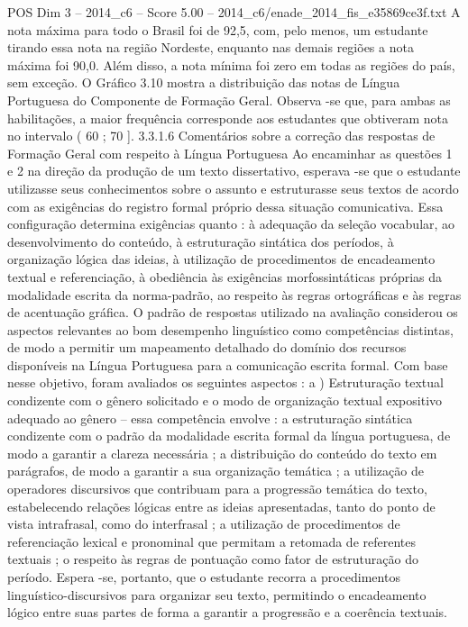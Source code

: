 \begin{textsample}{POS Dim 3 – 2014\_c6 – Score 5.00 – 2014\_c6/enade\_2014\_fis\_e35869ce3f.txt}
A nota máxima para todo o Brasil foi de 92,5, com, pelo menos, um estudante tirando essa nota na região Nordeste, enquanto nas demais regiões a nota máxima foi 90,0.
Além disso, a nota mínima foi zero em todas as regiões do país, sem exceção.
O Gráfico 3.10 mostra a distribuição das notas de Língua Portuguesa do Componente de Formação Geral.
Observa -se que, para ambas as habilitações, a maior frequência corresponde aos estudantes que obtiveram nota no intervalo ( 60 ; 70 ]. 3.3.1.6 Comentários sobre a correção das respostas de Formação Geral com respeito à Língua Portuguesa Ao encaminhar as questões 1 e 2 na direção da produção de um texto dissertativo, esperava -se que o estudante utilizasse seus conhecimentos sobre o assunto e estruturasse seus textos de acordo com as exigências do registro formal próprio dessa situação comunicativa.
Essa configuração determina exigências quanto : à adequação da seleção vocabular, ao desenvolvimento do conteúdo, à estruturação sintática dos períodos, à organização lógica das ideias, à utilização de procedimentos de encadeamento textual e referenciação, à obediência às exigências morfossintáticas próprias da modalidade escrita da norma-padrão, ao respeito às regras ortográficas e às regras de acentuação gráfica.
O padrão de respostas utilizado na avaliação considerou os aspectos relevantes ao bom desempenho linguístico como competências distintas, de modo a permitir um mapeamento detalhado do domínio dos recursos disponíveis na Língua Portuguesa para a comunicação escrita formal.
Com base nesse objetivo, foram avaliados os seguintes aspectos : a ) Estruturação textual condizente com o gênero solicitado e o modo de organização textual expositivo adequado ao gênero – essa competência envolve : a estruturação sintática condizente com o padrão da modalidade escrita formal da língua portuguesa, de modo a garantir a clareza necessária ; a distribuição do conteúdo do texto em parágrafos, de modo a garantir a sua organização temática ; a utilização de operadores discursivos que contribuam para a progressão temática do texto, estabelecendo relações lógicas entre as ideias apresentadas, tanto do ponto de vista intrafrasal, como do interfrasal ; a utilização de procedimentos de referenciação lexical e pronominal que permitam a retomada de referentes textuais ; o respeito às regras de pontuação como fator de estruturação do período.
Espera -se, portanto, que o estudante recorra a procedimentos linguístico-discursivos para organizar seu texto, permitindo o encadeamento lógico entre suas partes de forma a garantir a progressão e a coerência textuais.

\end{textsample}
